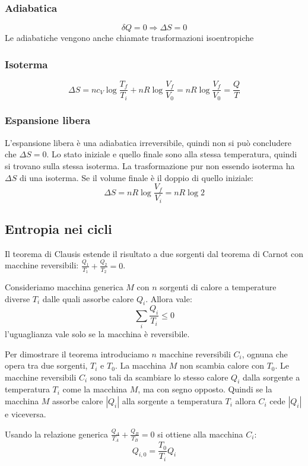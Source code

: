 \subsubsection{Adiabatica}
\[\delta Q=0 \Rightarrow \Delta S=0\]
Le adiabatiche vengono anche chiamate trasformazioni isoentropiche
\subsubsection{Isoterma}
\[\Delta S=nc_V\log\frac{T_f}{T_i}+nR\log\frac{V_f}{V_0}=nR\log\frac{V_f}{V_0}=\frac{Q}{T}\]
\subsubsection{Espansione libera}
L'espansione libera è una adiabatica irreversibile, quindi non si può concludere che $\Delta S=0$. Lo stato iniziale e quello finale sono alla stessa temperatura, quindi si trovano sulla stessa isoterma. La trasformazione pur non essendo isoterma ha $\Delta S$ di una isoterma. Se il volume finale è il doppio di quello iniziale:
\[\Delta S=nR\log\frac{V_f}{V_i}=nR\log 2\]

\subsection{Entropia nei cicli}
Il teorema di Clausis estende il risultato a due sorgenti dal teorema di Carnot con macchine reversibili: $\frac{Q_1}{T_1} + \frac{Q_2}{T_2} = 0$.
\begin{Teo}[Clausius]
   Consideriamo macchina generica $M$ con $n$ sorgenti di calore a temperature diverse $T_i$ dalle quali assorbe calore $Q_i$. Allora vale:
   \begin{equation}
      \sum_i \frac{Q_i}{T_i} \leq 0
   \end{equation}
   l'uguaglianza vale solo se la macchina è reversibile.
\end{Teo}

Per dimostrare il teorema introduciamo $n$ macchine reversibili $C_i$, ognuna che opera tra due sorgenti, $T_i$ e $T_0$. La macchina $M$ non scambia calore con $T_0$. Le macchine reversibili $C_i$ sono tali da scambiare lo stesso calore $Q_i$ dalla sorgente a temperatura $T_i$ come la macchina $M$, ma con segno opposto. Quindi se la macchina $M$ assorbe calore $|Q_i|$ alla sorgente a temperatura $T_i$ allora $C_i$ cede $|Q_i|$ e viceversa.

Usando la relazione generica $\frac{Q_A}{T_A} + \frac{Q_B}{T_B} = 0$ si ottiene alla macchina $C_i$:
\[
   Q_{i,0} = \frac{T_0}{T_i} Q_i
\]


